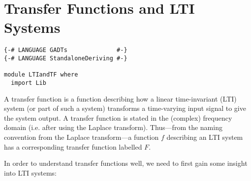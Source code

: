 \section{Transfer Functions and LTI Systems}\label{sec:tf}
\begin{verbatim}
{-# LANGUAGE GADTs              #-}
{-# LANGUAGE StandaloneDeriving #-}

module LTIandTF where
  import Lib
\end{verbatim}
\LNContinue
\noindent
A transfer function is a function describing how a linear time-invariant (LTI) system (or part of such a system) transforms a time-varying input signal to give the system output.\iffalse (more on LTI systems in a bit; \ref{sec:lti}). \fi 
 A transfer function is stated in the (complex) frequency domain (i.e. after using the Laplace transform). Thus---from the naming convention from the Laplace transform---a function $f$ describing an LTI system has a corresponding transfer function labelled $F$.

In order to understand transfer functions well, we need to first gain some insight into LTI systems:

